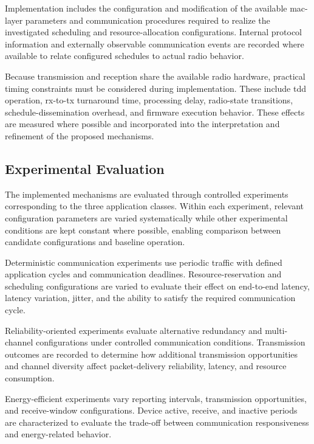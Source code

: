 \documentclass[12pt,a4paper]{article}
\begin{document}
Implementation includes the configuration and modification of the available
\gls{mac}-layer parameters and communication procedures required to realize
the investigated scheduling and resource-allocation configurations. Internal
protocol information and externally observable communication events are
recorded where available to relate configured schedules to actual radio
behavior.

Because transmission and reception share the available radio hardware,
practical timing constraints must be considered during implementation. These
include \gls{tdd} operation, \gls{rx}-to-\gls{tx} turnaround time, processing
delay, radio-state transitions, schedule-dissemination overhead, and firmware
execution behavior. These effects are measured where possible and incorporated
into the interpretation and refinement of the proposed mechanisms.


\subsection{Experimental Evaluation}
\label{subsec:experimental_evaluation}

The implemented mechanisms are evaluated through controlled experiments
corresponding to the three application classes. Within each experiment,
relevant configuration parameters are varied systematically while other
experimental conditions are kept constant where possible, enabling comparison
between candidate configurations and baseline operation.

Deterministic communication experiments use periodic traffic with defined
application cycles and communication deadlines. Resource-reservation and
scheduling configurations are varied to evaluate their effect on end-to-end
latency, latency variation, jitter, and the ability to satisfy the required
communication cycle.

Reliability-oriented experiments evaluate alternative redundancy and
multi-channel configurations under controlled communication conditions.
Transmission outcomes are recorded to determine how additional transmission
opportunities and channel diversity affect packet-delivery reliability,
latency, and resource consumption.

Energy-efficient experiments vary reporting intervals, transmission
opportunities, and receive-window configurations. Device active, receive, and
inactive periods are characterized to evaluate the trade-off between
communication responsiveness and energy-related behavior.
\end{document}
